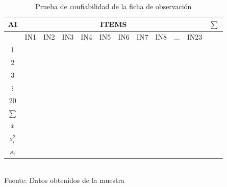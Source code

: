 \documentclass[12pt,a4paper]{article}
\begin{document}
\begin{table}[ht!]
	\caption{Prueba de confiabilidad de la ficha de observación}\label{pret:1}
	\begin{tabular}{cccccccccccc}%
		\toprule
		AI             & \multicolumn{10}{c}{ITEMS} & $\sum$                                                         \\\midrule
		               & IN1                        & IN2    & IN3 & IN4 & IN5 & IN6 & IN7 & IN8 & $\ldots$ & IN23 & \\\cline{2-11}
		1              &                            &        &     &     &     &     &     &     &          &      & \\
		2              &                            &        &     &     &     &     &     &     &          &      & \\
		3              &                            &        &     &     &     &     &     &     &          &      & \\
		$\vdots$       &                            &        &     &     &     &     &     &     &          &      & \\
		20             &                            &        &     &     &     &     &     &     &          &      & \\\midrule
		$\sum$         &                            &        &     &     &     &     &     &     &          &      & \\
		$\overline{x}$ &                            &        &     &     &     &     &     &     &          &      & \\
		$s_i^2$        &                            &        &     &     &     &     &     &     &          &      & \\
		$s_i$          &                            &        &     &     &     &     &     &     &          &      & \\\bottomrule
	\end{tabular}\\\vspace{0.1cm}
	{\normalsize Fuente: Datos obtenidos de la muestra}
\end{table}



\end{document}
